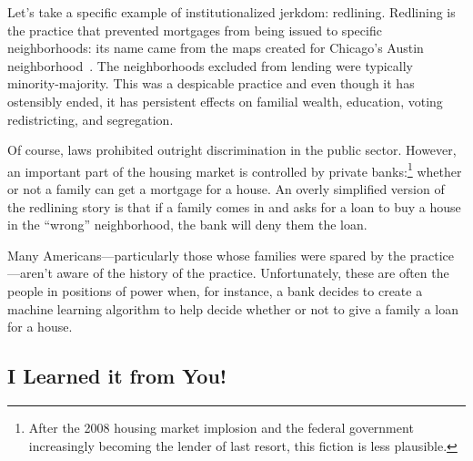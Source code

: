 Let's take a specific example of institutionalized jerkdom: redlining.
Redlining is the practice that prevented mortgages from being issued
to specific neighborhoods: its name came from the maps created for
Chicago's Austin neighborhood~\citep{pogge-92}.
The neighborhoods excluded from lending were typically minority-majority.
This was a despicable practice and even though it has ostensibly
ended, it has persistent effects on familial wealth, education, voting
redistricting, and segregation.

Of course, laws prohibited outright discrimination in the public
sector.  However, an important part of the housing market is
controlled by private banks:\footnote{After the 2008 housing market
  implosion and the federal government increasingly becoming the
  lender of last resort, this fiction is less plausible.} whether or
not a family can get a mortgage for a house.  An overly simplified
version of the redlining story is that if a family comes in and asks
for a loan to buy a house in the ``wrong'' neighborhood, the bank will
deny them the loan.

Many Americans---particularly those whose families were spared by the
practice---aren't aware of the history of the practice.
Unfortunately, these are often the people in positions of power when,
for instance, a bank decides to create a machine learning algorithm to
help decide whether or not to give a family a loan for a house.

\subsection{I Learned it from You!}


